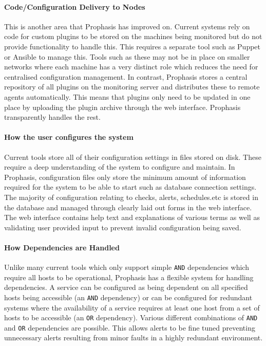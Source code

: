 \documentclass[bsc,logo,twoside,parskip,singlespacing,notimes]{infthesis}
\begin{document}
\paragraph*{Code/Configuration Delivery to Nodes} %
	This is another area that Prophasis has improved on.  Current systems rely on code for
	custom plugins to be stored on the machines being monitored but do not provide
	functionality to handle this.  This requires a separate tool such as Puppet or
	Ansible to manage this. Tools such as these may not be in
	place on smaller networks where each machine has a very distinct role which
	reduces the need for centralised configuration management.  In contrast,
	Prophasis stores a central repository of all plugins on the monitoring server
	and distributes these to remote agents automatically.  This means that plugins
	only need to be updated in one place by uploading the plugin archive through
	the web interface. Prophasis transparently handles the rest.

\paragraph*{How the user configures the system}
	Current tools store all of their configuration settings in files stored on
	disk. These require a deep understanding of the system to configure and
	maintain. In Prophasis, configuration files only store the minimum amount of
	information required for the system to be able to start such as database
	connection settings.  The majority of configuration relating to checks, alerts,
	schedules.etc is stored in the database and managed through clearly laid out
	forms in the web interface.  The web interface contains help text and
	explanations of various terms as well as validating user provided input to
	prevent invalid configuration being saved.

\paragraph*{How Dependencies are Handled}
	Unlike many current tools which only support simple \texttt{AND} dependencies
	which require all hosts to be operational,
	Prophasis has a flexible system for handling dependencies. A service can be
	configured as being dependent on all specified hosts being accessible (an
	\texttt{AND} dependency) or can be configured for redundant systems where the
	availability of a service requires at least one host from a set of hosts to be
	accessible (an \texttt{OR} dependency).  Various different combinations of
	\texttt{AND} and \texttt{OR} dependencies are possible.  This allows alerts to
	be fine tuned preventing unnecessary alerts resulting from minor faults in a
	highly redundant environment.
\end{document}
